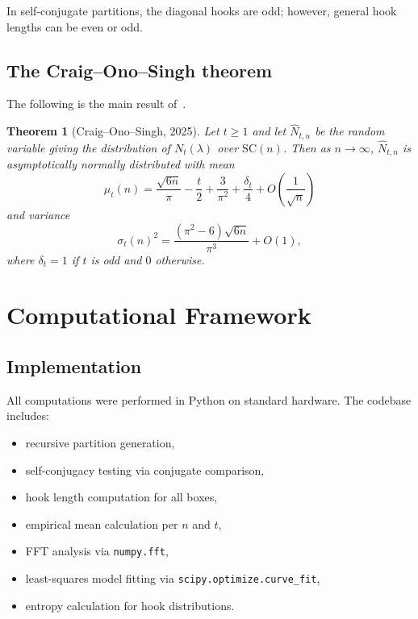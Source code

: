 \documentclass[11pt,reqno]{amsart}
\newtheorem{theorem}{Theorem}
\begin{document}
In self-conjugate partitions, the diagonal hooks are odd; however, 
general hook lengths can be even or odd.

\subsection{The Craig--Ono--Singh theorem}

The following is the main result of~\cite{COS}.

\begin{theorem}[Craig--Ono--Singh, 2025]\label{thm:COS}
Let $t \geq 1$ and let $\widehat{N}_{t,n}$ be the random 
variable giving the distribution of $N_t(\lambda)$ over 
$\mathrm{SC}(n)$. Then as $n \to \infty$, 
$\widehat{N}_{t,n}$ is asymptotically normally distributed 
with mean
\[
\mu_t(n) = \frac{\sqrt{6n}}{\pi} - \frac{t}{2} 
+ \frac{3}{\pi^2} + \frac{\delta_t}{4} 
+ O\!\left(\frac{1}{\sqrt{n}}\right)
\]
and variance
\[
\sigma_t(n)^2 = \frac{(\pi^2 - 6)\sqrt{6n}}{\pi^3} + O(1),
\]
where $\delta_t = 1$ if $t$ is odd and $0$ otherwise.
\end{theorem}

\section{Computational Framework}

\subsection{Implementation}

All computations were performed in Python on standard hardware. 
The codebase includes:
\begin{itemize}
\item recursive partition generation,
\item self-conjugacy testing via conjugate comparison,
\item hook length computation for all boxes,
\item empirical mean calculation per $n$ and $t$,
\item FFT analysis via \texttt{numpy.fft},
\item least-squares model fitting via \texttt{scipy.optimize.curve\_fit},
\item entropy calculation for hook distributions.
\end{itemize}
\end{document}
